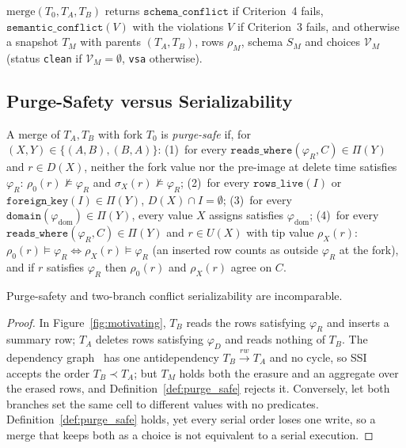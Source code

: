 \documentclass[sigconf, nonacm]{acmart}
\begin{document}
\begin{definition}
$\text{merge}(T_0, T_A, T_B)$ returns $\texttt{schema\_conflict}$ if Criterion~4 fails, $\texttt{semantic\_conflict}(V)$ with the violations $V$ if Criterion~3 fails, and otherwise a snapshot $T_M$ with parents $(T_A, T_B)$, rows $\rho_M$, schema $S_M$ and choices $\mathcal{V}_M$ (status \texttt{clean} if $\mathcal{V}_M = \emptyset$, \texttt{vsa} otherwise).
\end{definition}

\subsection{Purge-Safety versus Serializability}
\label{sec:model_invariant}

\begin{definition}
\label{def:purge_safe}
A merge of $T_A, T_B$ with fork $T_0$ is \emph{purge-safe} if, for $(X, Y) \in \{(A, B), (B, A)\}$:
(1)~for every $\texttt{reads\_where}(\varphi_R, C) \in \Pi(Y)$ and $r \in D(X)$, neither the fork value nor the pre-image at delete time satisfies $\varphi_R$: $\rho_0(r) \not\models \varphi_R$ and $\sigma_X(r) \not\models \varphi_R$;
(2)~for every $\texttt{rows\_live}(I)$ or $\texttt{foreign\_key}(I) \in \Pi(Y)$, $D(X) \cap I = \emptyset$;
(3)~for every $\texttt{domain}(\varphi_{\text{dom}}) \in \Pi(Y)$, every value $X$ assigns satisfies $\varphi_{\text{dom}}$;
(4)~for every $\texttt{reads\_where}(\varphi_R, C) \in \Pi(Y)$ and $r \in U(X)$ with tip value $\rho_X(r)$: $\rho_0(r) \models \varphi_R \Leftrightarrow \rho_X(r) \models \varphi_R$ (an inserted row counts as outside $\varphi_R$ at the fork), and if $r$ satisfies $\varphi_R$ then $\rho_0(r)$ and $\rho_X(r)$ agree on $C$.
\end{definition}

\begin{proposition}[Incomparability]
\label{prop:serializability}
Purge-safety and two-branch conflict serializability are incomparable.
\end{proposition}

\begin{proof}
In Figure~\ref{fig:motivating}, $T_B$ reads the rows satisfying $\varphi_R$ and inserts a summary row; $T_A$ deletes rows satisfying $\varphi_D$ and reads nothing of $T_B$. The dependency graph~\cite{adya1999weak} has one antidependency $T_B \xrightarrow{\mathit{rw}} T_A$ and no cycle, so SSI~\cite{cahill2008serializable} accepts the order $T_B \prec T_A$; but $T_M$ holds both the erasure and an aggregate over the erased rows, and Definition~\ref{def:purge_safe} rejects it. Conversely, let both branches set the same cell to different values with no predicates. Definition~\ref{def:purge_safe} holds, yet every serial order loses one write, so a merge that keeps both as a choice is not equivalent to a serial execution.
\end{proof}
\end{document}
